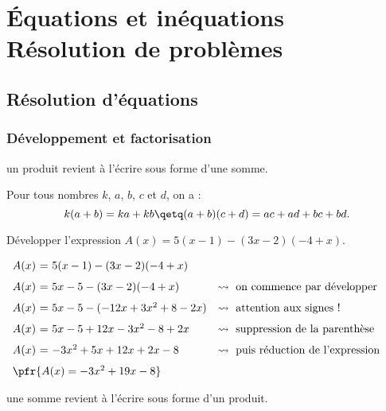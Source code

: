 \documentclass[10pt,openright,twoside,french]{book}
\begin{document}
\chapter[\'Equations et inéquations]{\'Equations et inéquations\\ Résolution de problèmes}\label{ch_equation}

\section{Résolution d'équations}
\subsection{Développement et factorisation}

\begin{Defi}
     un produit revient à l'écrire sous forme d'une somme.
\end{Defi}

\begin{Prop}
    Pour tous nombres $k$, $a$, $b$, $c$ et $d$, on a :
    \[k(a + b) = ka + kb \qetq (a + b)(c + d) = ac + ad + bc+ bd.\]
\end{Prop}

\begin{Exemple}
    Développer l'expression $A(x) = 5(x - 1) - (3x - 2)(-4 + x)$.\par\smallskip
    \hspace{-2cm}$\begin{array}{r@{\ =\ }ll}
        A(x) & 5(x - 1) - (3x - 2)(-4 + x) & \\[7pt]
        A(x) & 5x - 5 - (3x - 2)(-4 + x) & \rightsquigarrow\ \text{on commence par développer} \\[7pt]
        A(x) & 5x - 5 -(-12x + 3x^2 + 8 - 2x) & \rightsquigarrow\ \text{attention aux signes !}\\[7pt]
        A(x) & 5x - 5 + 12x - 3x^2 - 8 + 2x & \rightsquigarrow\ \text{suppression de la parenthèse}\\[7pt]
        A(x) & -3x^2 + 5x + 12x + 2x - 8 & \rightsquigarrow\ \text{puis réduction de l'expression} \\[7pt]
        \multicolumn{3}{l}{\pfr{A(x) = -3x^2 + 19x - 8}}
    \end{array}$
\end{Exemple}

\begin{Defi}
     une somme revient à l'écrire sous forme d'un produit.
\end{Defi}
\end{document}
